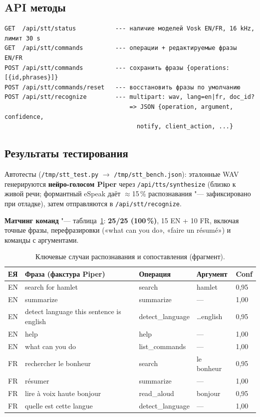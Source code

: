 \subsection{API методы}

\begin{lstlisting}[caption={HTTP эндпоинты подсистемы распознавания речи.},label={lst:stt_api}]
GET  /api/stt/status           --- наличие моделей Vosk EN/FR, 16 kHz, лимит 30 s
GET  /api/stt/commands         --- операции + редактируемые фразы EN/FR
POST /api/stt/commands         --- сохранить фразы {operations:[{id,phrases}]}
POST /api/stt/commands/reset   --- восстановить фразы по умолчанию
POST /api/stt/recognize        --- multipart: wav, lang=en|fr, doc_id?
                                   => JSON {operation, argument, confidence,
                                     notify, client_action, ...}
\end{lstlisting}

\subsection{Результаты тестирования}

Автотесты (\texttt{/tmp/stt\_test.py} $\to$ \texttt{/tmp/stt\_bench.json}):
эталонные WAV генерируются \textbf{нейро-голосом Piper} через
\texttt{/api/tts/synthesize} (близко к живой речи; формантный eSpeak даёт
$\approx$15\,\% распознавания "--- зафиксировано при отладке),
затем отправляются в \texttt{/api/stt/recognize}.

\textbf{Матчинг команд} "--- таблица~\ref{tab:stt_acc}: \textbf{25/25 (100\,\%)},
15 EN + 10 FR, включая точные фразы, перефразировки («what can you do»,
«faire un résumé») и команды с аргументами.

\begin{table}[H]
	\caption{Ключевые случаи распознавания и сопоставления (фрагмент).}
	\label{tab:stt_acc}
	\begin{tabular}{|l|l|l|l|l|}
		\hline
		ЕЯ & Фраза (факстура Piper) & Операция & Аргумент & Conf \\ \hline
		EN & search for hamlet & search & hamlet & 0,95 \\
		EN & summarize & summarize & --- & 1,00 \\
		EN & detect language this sentence is english & detect\_language & \ldots english & 0,95 \\
		EN & help & help & --- & 1,00 \\
		EN & what can you do & list\_commands & --- & 1,00 \\
		FR & rechercher le bonheur & search & le bonheur & 0,95 \\
		FR & résumer & summarize & --- & 1,00 \\
		FR & lire à voix haute bonjour & read\_aloud & bonjour & 0,95 \\
		FR & quelle est cette langue & detect\_language & --- & 1,00 \\ \hline
	\end{tabular}
\end{table}

